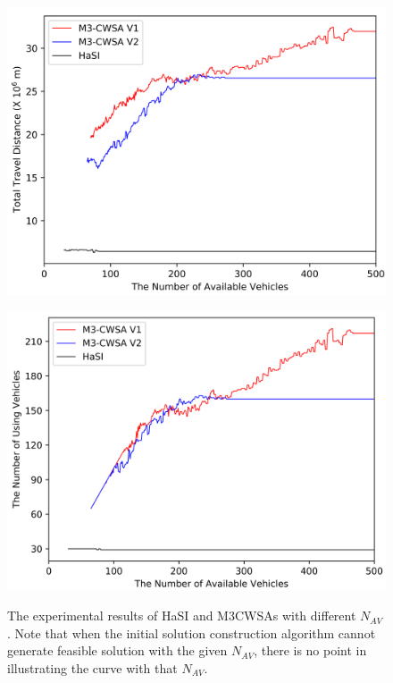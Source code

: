 \documentclass[journal]{IEEEtran}
\begin{document}
\begin{figure}[htbp] 
	\centering
	\begin{subfloat}{
		\includegraphics[width=.45\textwidth]{cwsa_dist.png}}
	\end{subfloat}
	\begin{subfloat}{\includegraphics[width=.45\textwidth]{cwsa_vehicle.png}}
	\end{subfloat}
	\caption{\label{init_solution_figure}
	The experimental results of HaSI and M3CWSAs with different $N_{AV}$. Note that when the initial solution construction algorithm cannot generate feasible solution with the given $N_{AV}$, there is no point in illustrating the curve with that $N_{AV}$.}
\end{figure}
\end{document}
